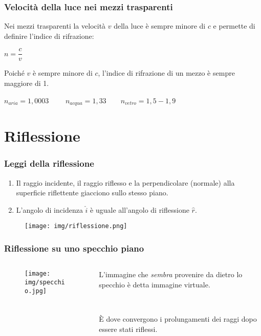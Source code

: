 \documentclass[]{beamer}
\theoremstyle{plain}
\begin{document}
\begin{frame}
\frametitle{Velocità della luce nei mezzi trasparenti}
Nei mezzi trasparenti la velocità $ v $ della luce è sempre minore di $ c $ e permette di definire l'\alert{indice di rifrazione}:
\begin{center}
\colorbox{blue!30}{$ n = \dfrac{c}{v} $} 
\end{center}\pause
Poiché $ v $ è sempre minore di $ c $, l'indice di rifrazione di un mezzo è sempre maggiore di 1.
\begin{center}
$ n_{aria} = 1,0003$~~~~ $ n_{acqua} = 1,33$~~~~$ n_{vetro} = 1,5-1,9$
\end{center}
\end{frame}




\section{Riflessione}

\begin{frame}
\frametitle{Leggi della riflessione}
\begin{enumerate}
  \item Il raggio incidente, il raggio riflesso e la perpendicolare (normale) alla superficie riflettente giacciono sullo stesso piano.
  \item L'angolo di incidenza $ \hat{i} $ è uguale all'angolo di riflessione $ \hat{r} $.
\end{enumerate}
\begin{figure}
\texttt{[image: img/riflessione.png]}
\end{figure}
\end{frame}


\begin{frame}
\frametitle{Riflessione su uno specchio piano}
\begin{columns}
\begin{column}{0.5\textwidth}
\begin{figure}
\texttt{[image: img/specchio.jpg]}
\end{figure}
\end{column}
\begin{column}{0.5\textwidth}
L'immagine che \emph<1>{sembra} provenire da dietro lo specchio è detta \alert<1>{immagine virtuale}.\pause

~

È dove convergono i \alert<2>{prolungamenti dei raggi} dopo essere stati riflessi.
\end{column}
\end{columns}
\end{frame}
\end{document}
